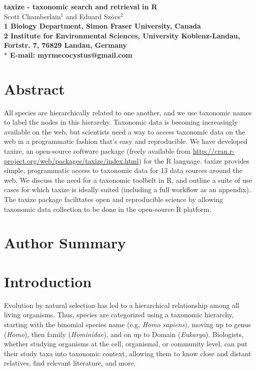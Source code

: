 \documentclass[10pt]{article}\usepackage[]{graphicx}\usepackage[]{color}
\date{}
\begin{document}
\begin{flushleft}
{\Large
\textbf{taxize - taxonomic search and retrieval in R}
}
\\
Scott Chamberlain$^{1}$ and 
Eduard Sz\"{o}cs$^{2}$
\\
\bf{1} Biology Department, Simon Fraser University, Canada
\\
\bf{2} Institute for Environmental Sciences, University Koblenz-Landau, Fortstr. 7, 76829 Landau, Germany
\\
$\ast$ E-mail: myrmecocystus@gmail.com
\end{flushleft}

\section*{Abstract}
All species are hierarchically related to one another, and we use taxonomic names to label the nodes in this hierarchy. Taxonomic data is becoming increasingly available on the web, but scientists need a way to access taxonomic data on the web in a programmatic fashion that's easy and reproducible. We have developed taxize, an open-source software package (freely available from \url{http://cran.r-project.org/web/packages/taxize/index.html}) for the R language. taxize provides simple, programmatic access to taxonomic data for 13 data sources around the web. We discuss the need for a taxonomic toolbelt in R, and outline a suite of use cases for which taxize is ideally suited (including a full workflow as an appendix). The taxize package facilitates open and reproducible science by allowing taxonomic data collection to be done in the open-source R platform.

\section*{Author Summary}

\section*{Introduction}
Evolution by natural selection has led to a hierarchical relationship among all living organisms.  Thus, species are categorized using a taxonomic hierarchy, starting with the binomial species name (e.g, \emph{Homo sapiens}), moving up to genus (\emph{Homo}), then family (\emph{Hominidae}), and on up to Domain (\emph{Eukarya}). Biologists, whether studying organisms at the cell, organismal, or community level, can put their study taxa into taxonomic context, allowing them to know close and distant relatives, find relevant literature, and more. 
\end{document}
